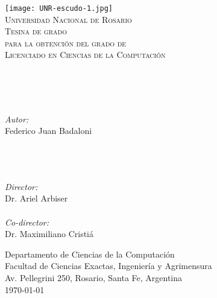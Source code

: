 {%
\thispagestyle{empty}
\begin{center}
    \texttt{[image: UNR-escudo-1.jpg]}
    \\[0.5cm]
    \textsc{\LARGE Universidad Nacional de Rosario}\\[1.5cm]

    \textsc{{\Large Tesina de grado} \\ para la obtenci\'on del grado de \\
     Licenciado en Ciencias de la Computaci\'on}\\[0.5cm]
    \HRule \\[0.4cm] %
        {\huge {} \\[0.4cm]}

    \HRule \\[0.4cm] %
    \noindent
    \begin{minipage}{0.4\textwidth}
        \begin{flushleft} \large
            \emph{Autor:}\\
            Federico Juan Badaloni \\\ \\\ \\\ \\
        \end{flushleft}
        \end{minipage}%
        \begin{minipage}{0.4\textwidth}
        \begin{flushright} \large
            \emph{Director:} \\
            Dr. Ariel Arbiser\\
            \ \\
            \emph{Co-director:} \\
            Dr. Maximiliano Cristiá\\
        \end{flushright}
    \end{minipage}

\vfill

Departamento de Ciencias de la Computaci\'on\\
Facultad de Ciencias Exactas, Ingenier\'ia y Agrimensura\\
Av. Pellegrini 250, Rosario, Santa Fe, Argentina\\[0.4cm]
{\large \today}

\end{center}
\clearpage
}